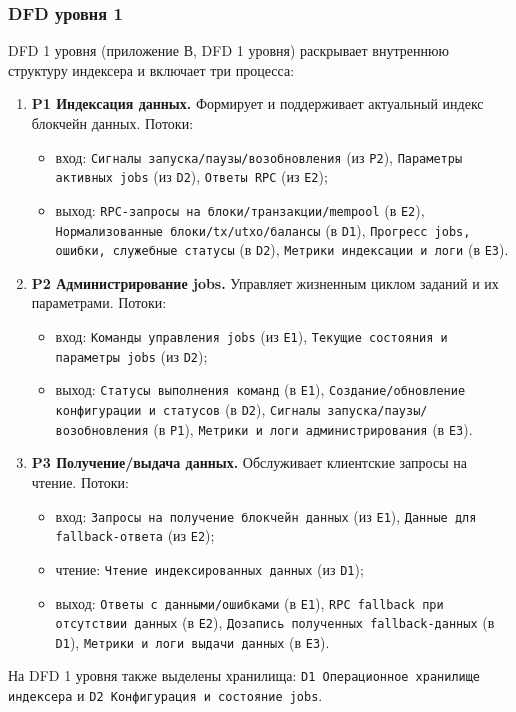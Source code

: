 ﻿\documentclass[14pt,a4paper]{extarticle}
\begin{document}
\subsubsection{DFD уровня 1}
\noindent DFD 1 уровня (приложение В, DFD 1 уровня) раскрывает внутреннюю структуру индексера и включает три процесса:
\begin{enumerate}
  \item \textbf{P1 Индексация данных.} Формирует и поддерживает актуальный индекс блокчейн данных.
  Потоки:
  \begin{itemize}
    \item вход: \texttt{Сигналы запуска/паузы/возобновления} (из \texttt{P2}), \texttt{Параметры активных jobs} (из \texttt{D2}), \texttt{Ответы RPC} (из \texttt{E2});
    \item выход: \texttt{RPC-запросы на блоки/транзакции/mempool} (в \texttt{E2}), \texttt{Нормализованные блоки/tx/utxo/балансы} (в \texttt{D1}), \texttt{Прогресс jobs, ошибки, служебные статусы} (в \texttt{D2}), \texttt{Метрики индексации и логи} (в \texttt{E3}).
  \end{itemize}
  \item \textbf{P2 Администрирование jobs.} Управляет жизненным циклом заданий и их параметрами.
  Потоки:
  \begin{itemize}
    \item вход: \texttt{Команды управления jobs} (из \texttt{E1}), \texttt{Текущие состояния и параметры jobs} (из \texttt{D2});
    \item выход: \texttt{Статусы выполнения команд} (в \texttt{E1}), \texttt{Создание/обновление конфигурации и статусов} (в \texttt{D2}), \texttt{Сигналы запуска/паузы/возобновления} (в \texttt{P1}), \texttt{Метрики и логи администрирования} (в \texttt{E3}).
  \end{itemize}
  \item \textbf{P3 Получение/выдача данных.} Обслуживает клиентские запросы на чтение.
  Потоки:
  \begin{itemize}
    \item вход: \texttt{Запросы на получение блокчейн данных} (из \texttt{E1}), \texttt{Данные для fallback-ответа} (из \texttt{E2});
    \item чтение: \texttt{Чтение индексированных данных} (из \texttt{D1});
    \item выход: \texttt{Ответы с данными/ошибками} (в \texttt{E1}), \texttt{RPC fallback при отсутствии данных} (в \texttt{E2}), \texttt{Дозапись полученных fallback-данных} (в \texttt{D1}), \texttt{Метрики и логи выдачи данных} (в \texttt{E3}).
  \end{itemize}
\end{enumerate}
\noindent На DFD 1 уровня также выделены хранилища: \texttt{D1 Операционное хранилище индексера} и \texttt{D2 Конфигурация и состояние jobs}.
\end{document}
